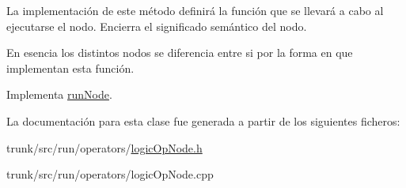 La implementación de este método definirá la función que se llevará a cabo al ejecutarse el nodo. Encierra el significado semántico del nodo.

En esencia los distintos nodos se diferencia entre si por la forma en que implementan esta función. 

Implementa \hyperlink{classrunNode_a83c10df8148829b08e04153c93d69eec}{run\-Node}.



La documentación para esta clase fue generada a partir de los siguientes ficheros\-:\begin{DoxyCompactItemize}
\item 
trunk/src/run/operators/\hyperlink{logicOpNode_8h}{logic\-Op\-Node.\-h}\item 
trunk/src/run/operators/logic\-Op\-Node.\-cpp\end{DoxyCompactItemize}
